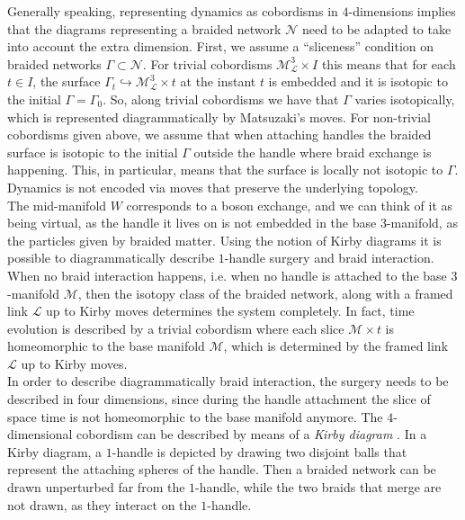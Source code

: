 \documentclass[aps,nofootinbib,amsfonts,superscriptaddress]{revtex4}
\begin{document}
Generally speaking, representing dynamics as cobordisms in $4$-dimensions implies that the diagrams representing a braided network $\mathcal N$ need to be adapted to take into account the extra dimension. First, we assume a ``sliceness'' condition on braided networks $\Gamma\subset \mathcal N$. For trivial cobordisms $\mathcal M_{\mathcal L}^3\times I$ this means that for each $t\in I$, the surface $\Gamma_t\hookrightarrow \mathcal M_{\mathcal L}^3\times t$ at the instant $t$ is embedded and it is isotopic to the initial $\Gamma = \Gamma_0$. So, along trivial cobordisms we have that $\Gamma$ varies isotopically, which is represented diagrammatically by Matsuzaki's moves. For non-trivial cobordisms given above, we assume that when attaching handles the braided surface is isotopic to the initial $\Gamma$ outside the handle where braid exchange is happening. This, in particular, means that the surface is locally not isotopic to $\Gamma$. Dynamics is not encoded via moves that preserve the underlying topology. \\

The mid-manifold $W$ corresponds to a boson exchange, and we can think of it as being virtual, as the handle it lives on is not embedded in the base $3$-manifold, as the particles given by braided matter. Using the notion of Kirby diagrams it is possible to diagrammatically describe $1$-handle surgery and braid interaction. \\

When no braid interaction happens, i.e. when no handle is attached to the base $3$-manifold $\mathcal M$, then the isotopy class of the braided network, along with a framed link $\mathcal L$ up to Kirby moves determines the system completely. In fact, time evolution is described by a trivial cobordism where each slice $\mathcal M\times t$ is homeomorphic to the base manifold $\mathcal M$, which is determined by the framed link $\mathcal L$ up to Kirby moves. \\

In order to describe diagrammatically braid interaction, the surgery needs to be described in four dimensions, since during the handle attachment the slice of space time is not homeomorphic to the base manifold anymore. The $4$-dimensional cobordism can be described by means of a {\it Kirby diagram} \cite{4Manifolds}. In a Kirby diagram, a $1$-handle is depicted by drawing two disjoint balls that represent the attaching spheres of the handle. Then a braided network can be drawn unperturbed far from the $1$-handle, while the two braids that merge are not drawn, as they interact on the $1$-handle. 
\end{document}
